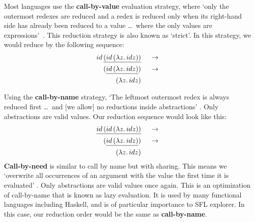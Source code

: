 \noindent Most languages use the \textbf{call-by-value} evaluation strategy, where `only the outermost redexes are reduced and a redex is reduced only when its right-hand side has already been reduced to a value \ldots\ where the only values are \lambda expressions'~\cite{pierce2002types}. This reduction strategy is also known as `strict'. In this strategy, we would reduce by the following sequence:
\begin{alignat*}{2}
id\,\underline{(id\,(\lambda z.\, id z))}  && \;\;\rightarrow\\ 
(\underline{id\,(\lambda z.\, id z)})      && \;\;\rightarrow\\ 
(\lambda z.\, id z)                        && \;\;\\ 
\end{alignat*}

\noindent Using the \textbf{call-by-name} strategy, `The leftmost outermost redex is always reduced first \ldots\ and [we allow] no reductions inside abstractions' \cite{pierce2002types}. Only abstractions are valid values. Our reduction sequence would look like this:
\begin{alignat*}{2}
\underline{id\,(id\,(\lambda z.\, id z))}  && \;\;\rightarrow\\ 
(\underline{id\,(\lambda z.\, id z)})      && \;\;\rightarrow\\ 
(\lambda z.\, id z)                        && \;\;\\ 
\end{alignat*}
\noindent \textbf{Call-by-need} is similar to call by name but with sharing. This means we `overwrite all occurrences of an argument with the value the first time it is evaluated' \cite{pierce2002types}. Only abstractions are valid values once again. This is an optimization of call-by-name that is known as lazy evaluation. It is used by many functional languages including Haskell, and is of particular importance to SFL explorer. In this case, our reduction order would be the same as \textbf{call-by-name}. 


